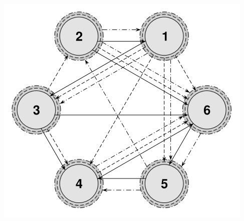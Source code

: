 \documentclass{article}
\begin{document}
\begin{center}
\includegraphics[width=1\linewidth]{graph}\\
\bigskip
\end{center}
\end{document}

